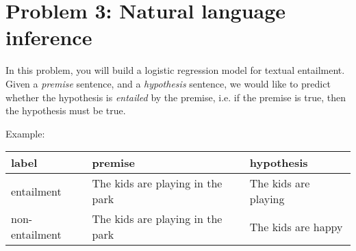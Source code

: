 \documentclass{article}
\theoremstyle{case}
\theoremstyle{definition}
\begin{document}
\newpage
\section*{Problem 3: Natural language inference}
In this problem, you will build a logistic regression model for textual entailment.
Given a \textit{premise} sentence,
and a \textit{hypothesis} sentence,
we would like to predict whether the hypothesis is \textit{entailed} by the premise,
i.e. if the premise is true, then the hypothesis must be true.

Example:
\begin{center}
    \begin{tabular}{lll}
        label & premise & hypothesis \\
        \hline
        entailment & The kids are playing in the park & The kids are playing \\
        non-entailment &The kids are playing in the park & The kids are happy 
    \end{tabular}
\end{center}
\end{document}
